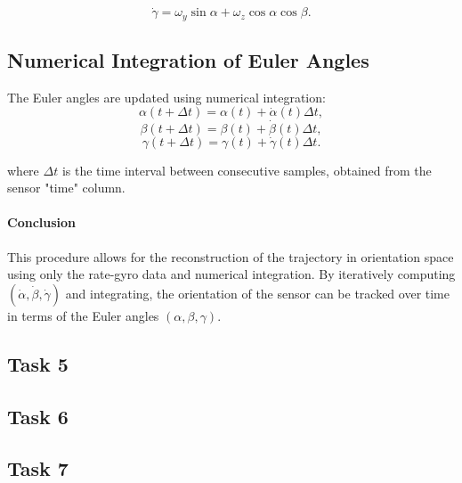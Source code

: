 \documentclass[12pt]{article}
\begin{document}
\begin{equation}
\label{eq:gamma}
\dot{\gamma} = \omega_y \sin\alpha + \omega_z \cos\alpha \cos\beta.
\end{equation}


\subsection{Numerical Integration of Euler Angles}
The Euler angles are updated using numerical integration:
\begin{equation}
\label{eq:integration_alpha}
\alpha(t + \Delta t) = \alpha(t) + \dot{\alpha}(t) \Delta t,
\end{equation}
\begin{equation}
\label{eq:integration_beta}
\beta(t + \Delta t) = \beta(t) + \dot{\beta}(t) \Delta t,
\end{equation}
\begin{equation}
\label{eq:integration_gamma}
\gamma(t + \Delta t) = \gamma(t) + \dot{\gamma}(t) \Delta t.
\end{equation}

where \(\Delta t\) is the time interval between consecutive samples, obtained from the sensor "time" column.

\paragraph{Conclusion}

This procedure allows for the reconstruction of the trajectory in orientation space using only the rate-gyro data and numerical integration. By iteratively computing \((\dot{\alpha}, \dot{\beta}, \dot{\gamma})\) and integrating, the orientation of the sensor can be tracked over time in terms of the Euler angles \((\alpha, \beta, \gamma)\).




\subsection{Task 5}


\subsection{Task 6}


\subsection{Task 7}
\end{document}
